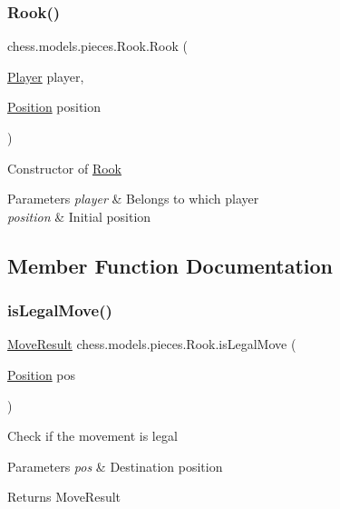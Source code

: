 \subsubsection{\texorpdfstring{Rook()}{Rook()}}
{\footnotesize\ttfamily chess.\+models.\+pieces.\+Rook.\+Rook (\begin{DoxyParamCaption}\item[{\mbox{\hyperlink{enumchess_1_1models_1_1enums_1_1_player}{Player}}}]{player,  }\item[{\mbox{\hyperlink{classchess_1_1models_1_1_position}{Position}}}]{position }\end{DoxyParamCaption})}

Constructor of \mbox{\hyperlink{classchess_1_1models_1_1pieces_1_1_rook}{Rook}}


\begin{DoxyParams}{Parameters}
{\em player} & Belongs to which player \\
\hline
{\em position} & Initial position \\
\hline
\end{DoxyParams}


\subsection{Member Function Documentation}
\mbox{\label{classchess_1_1models_1_1pieces_1_1_rook_adf20fa1c361d9122cae9fd20f543f8e4}} 
\subsubsection{\texorpdfstring{is\+Legal\+Move()}{isLegalMove()}}
{\footnotesize\ttfamily \mbox{\hyperlink{enumchess_1_1models_1_1enums_1_1_move_result}{Move\+Result}} chess.\+models.\+pieces.\+Rook.\+is\+Legal\+Move (\begin{DoxyParamCaption}\item[{\mbox{\hyperlink{classchess_1_1models_1_1_position}{Position}}}]{pos }\end{DoxyParamCaption})}

Check if the movement is legal


\begin{DoxyParams}{Parameters}
{\em pos} & Destination position \\
\hline
\end{DoxyParams}
\begin{DoxyReturn}{Returns}
Move\+Result 
\end{DoxyReturn}
\mbox{\label{classchess_1_1models_1_1pieces_1_1_rook_a73f28ce35486a866fabe250ad4490993}} 
